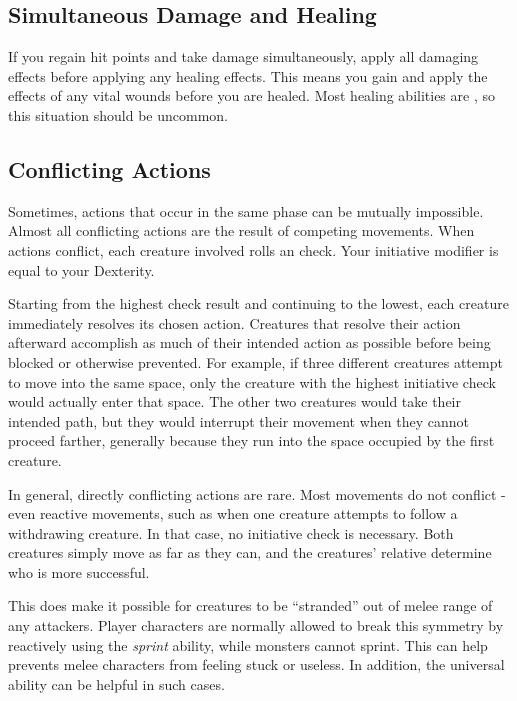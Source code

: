   \subsection{Simultaneous Damage and Healing}\label{Simultaneous Damage and Healing}
    If you regain hit points and take damage simultaneously, apply all damaging effects before applying any healing effects.
    This means you gain and apply the effects of any vital wounds before you are healed.
    Most healing abilities are , so this situation should be uncommon.

  \subsection{Conflicting Actions}\label{Conflicting Actions}
    Sometimes, actions that occur in the same phase can be mutually impossible.
    Almost all conflicting actions are the result of competing movements.
    When actions conflict, each creature involved rolls an  check.
    Your initiative modifier is equal to your Dexterity.

    Starting from the highest check result and continuing to the lowest, each creature immediately resolves its chosen action.
    Creatures that resolve their action afterward accomplish as much of their intended action as possible before being blocked or otherwise prevented.
    For example, if three different creatures attempt to move into the same space, only the creature with the highest initiative check would actually enter that space.
    The other two creatures would take their intended path, but they would interrupt their movement when they cannot proceed farther, generally because they run into the space occupied by the first creature.

    In general, directly conflicting actions are rare.
    Most movements do not conflict - even reactive movements, such as when one creature attempts to follow a withdrawing creature.
    In that case, no initiative check is necessary.
    Both creatures simply move as far as they can, and the creatures' relative  determine who is more successful.

    This does make it possible for creatures to be ``stranded'' out of melee range of any attackers.
    Player characters are normally allowed to break this symmetry by reactively using the \textit{sprint} ability, while monsters cannot sprint.
    This can help prevents melee characters from feeling stuck or useless.
    In addition, the  universal ability can be helpful in such cases.

